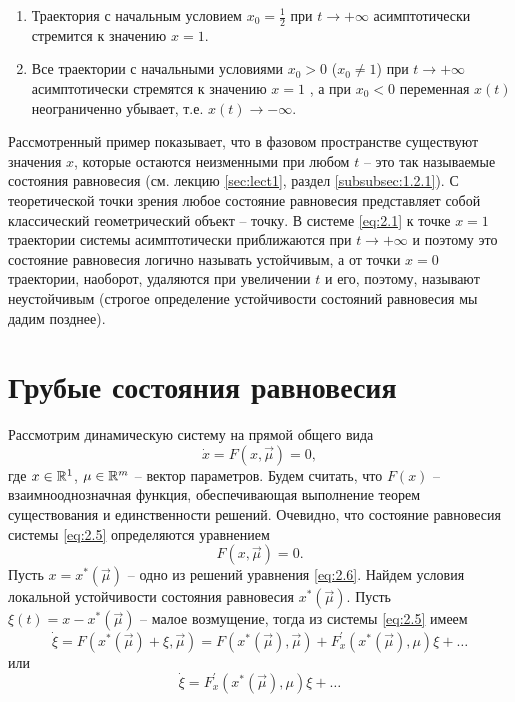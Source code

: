 \begin{enumerate}
	\item Траектория с начальным условием $x_0=\frac12$ при $t \rightarrow + \infty$ асимптотически стремится к значению $x=1$.
	\item Все траектории с начальными условиями $x_0>0$ ($x_0\neq1$) при $t \rightarrow + \infty$ асимптотически стремятся к значению $x=1$ , а при $x_0<0$ переменная $x(t)$ неограниченно убывает, т.е. $x(t) \rightarrow - \infty$. 
\end{enumerate}

Рассмотренный пример показывает, что в фазовом пространстве существуют значения $x$, которые остаются неизменными при любом $t$ -- это так называемые состояния равновесия (см. лекцию \ref{sec:lect1}, раздел \ref{subsubsec:1.2.1}). С теоретической точки зрения любое состояние равновесия представляет собой классический геометрический объект -- точку. В системе \eqref{eq:2.1} к точке $x=1$ траектории системы асимптотически приближаются при $t \rightarrow + \infty$ и поэтому это состояние равновесия логично называть устойчивым, а от точки $x=0$ траектории, наоборот, удаляются при увеличении $t$ и его, поэтому, называют неустойчивым (строгое определение устойчивости состояний равновесия мы дадим позднее).


\section{Грубые состояния равновесия} %
\label{subsec:2.2}

Рассмотрим динамическую систему на прямой общего вида
\begin{equation}
	\label{eq:2.5}
	\dot x = F(x, \vec \mu) =0,
\end{equation}
где $x \in \mathbb{R}^1$, $\mathbf \mu \in \mathbb{R}^m$ -- вектор параметров. Будем считать, что $F(x)$ -- взаимнооднозначная функция, обеспечивающая выполнение теорем существования и единственности решений. Очевидно, что состояние равновесия системы \eqref{eq:2.5} определяются уравнением
\begin{equation}
	\label{eq:2.6}
	F(x, \vec \mu) =0.
\end{equation}
Пусть $x=x^*(\vec \mu)$ -- одно из решений уравнения \eqref{eq:2.6}. Найдем условия локальной устойчивости состояния равновесия $x^*(\vec \mu)$. Пусть $\xi(t) = x - x^*(\vec \mu)$ -- малое возмущение, тогда из системы \eqref{eq:2.5} имеем
\begin{equation}
	\label{eq:}
	\dot \xi = F(x^*(\vec \mu)+ \xi, \vec \mu) = F(x^*(\vec \mu), \vec \mu) + F^\prime_x (x^*(\vec \mu), \mu) \xi + \dots
\end{equation}
или
\begin{equation}
	\label{eq:2.7}
	\dot \xi = F^\prime_x (x^*(\vec \mu), \mu) \xi + \dots
\end{equation}

